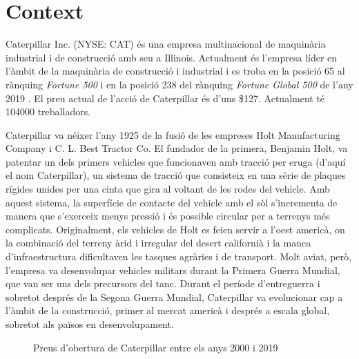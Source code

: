 \documentclass{article}
\numberwithin{table}{section}
\numberwithin{figure}{section}
\numberwithin{equation}{section}
\begin{document}
\section{Context}
Caterpillar Inc. (NYSE: CAT) és una empresa multinacional de maquinària industrial i de construcció amb seu a Illinois. Actualment és l'empresa líder en l'àmbit de la maquinària de construcció i industrial \cite{cat} i es troba en la posició 65 al rànquing \emph{Fortune 500} i en la posició 238 del rànquing \emph{Fortune Global 500} de l'any 2019 \cite{fortune,global}. El preu actual de l'acció de Caterpillar és d'uns \$127. Actualment té \num{104000} treballadors. 

Caterpillar va néixer l'any 1925 de la fusió de les empreses Holt Manufacturing Company i C. L. Best Tractor Co. El fundador de la primera, Benjamin Holt, va patentar un dels primers vehicles que funcionaven amb tracció per eruga (d'aquí el nom Caterpillar), un sistema de tracció que consisteix en una sèrie de plaques rígides unides per una cinta que gira al voltant de les rodes del vehicle. Amb aquest sistema, la superfície de contacte del vehicle amb el sòl s'incrementa de manera que s'exerceix menys pressió i és possible circular per a terrenys més complicats. Originalment, els vehicles de Holt es feien servir a l'oest americà, on la combinació del terreny àrid i irregular del desert californià i la manca d'infraestructura dificultaven les tasques agràries i de transport. Molt aviat, però, l'empresa va desenvolupar vehicles militars durant la Primera Guerra Mundial, que van ser uns dels precursors del tanc. Durant el període d'entreguerra i sobretot després de la Segona Guerra Mundial, Caterpillar va evolucionar cap a l'àmbit de la construcció, primer al mercat americà i després a escala global, sobretot als països en desenvolupament. 

\begin{figure}[htb]
	\centering \sffamily \small
	
	\caption{Preus d'obertura de Caterpillar entre els anys 2000 i 2019}
	\label{fig:tancament}
\end{figure}
\end{document}
